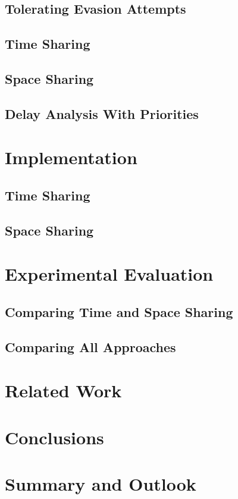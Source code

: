 \documentclass{beamer}
\begin{document}
\subsection{Tolerating Evasion Attempts}
\subsection{Time Sharing}
\subsection{Space Sharing}
\subsection{Delay Analysis With Priorities}
\section{Implementation} 
\subsection{Time Sharing}
\subsection{Space Sharing}
\section{Experimental Evaluation} 
\subsection{Comparing Time and Space Sharing}
\subsection{Comparing All Approaches}
\section{Related Work} 
\section{Conclusions} 

\section{Summary and Outlook} 
\end{document}
